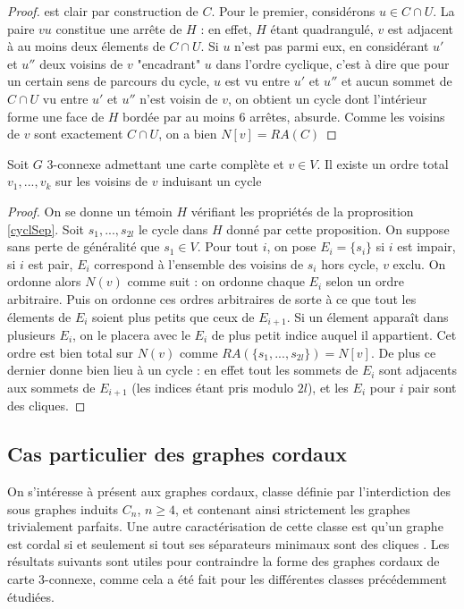 \documentclass{scrartcl}
\begin{document}
\begin{flushleft}
\begin{proof}
    est clair par construction de $C$. Pour le premier, considérons $u \in C \cap U$. La paire $vu$ constitue une arrête de $H$ :
    en effet, $H$ étant quadrangulé, $v$ est adjacent à au moins deux élements de $C \cap U$. Si $u$ n'est pas parmi eux,
    en considérant $u'$ et $u''$ deux voisins de $v$ "encadrant" $u$ dans l'ordre cyclique, c'est à dire que pour un certain
    sens de parcours du cycle, $u$ est vu entre $u'$ et $u''$ et aucun sommet de $C \cap U$ vu entre $u'$ et $u''$ n'est voisin
    de $v$, on obtient un cycle dont l'intérieur forme une face de $H$ bordée par au moins $6$ arrêtes, absurde. Comme les voisins
    de $v$ sont exactement $C \cap U$, on a bien $N[v] = RA(C)$
\end{proof}

\begin{cor}\label{ordCycl}
    Soit $G$ $3$-connexe admettant une carte complète et $v \in V$. Il existe un ordre total $v_1, ..., v_k$ sur les voisins de $v$
    induisant un cycle
\end{cor}

\begin{proof}
    On se donne un témoin $H$ vérifiant les propriétés de la proprosition \ref{cyclSep}. Soit $s_1, ..., s_{2l}$ le cycle dans $H$
    donné par cette proposition. On suppose sans perte de généralité que $s_1 \in V$. Pour tout $i$, on pose $E_i = \{s_i\}$
    si $i$ est impair, si $i$ est pair, $E_i$ correspond à l'ensemble des voisins de $s_i$ hors cycle, $v$ exclu. On ordonne alors $N(v)$
    comme suit : on ordonne chaque $E_i$ selon un ordre arbitraire. Puis on ordonne ces ordres arbitraires de sorte à ce que
    tout les élements de $E_i$ soient plus petits que ceux de $E_{i+1}$. Si un élement apparaît dans plusieurs $E_i$, on le placera avec
    le $E_i$ de plus petit indice auquel il appartient. Cet ordre est bien total sur $N(v)$
    comme $RA(\{s_1, ..., s_{2l}\}) = N[v]$. De plus ce dernier donne bien lieu à un cycle : en effet tout les sommets de $E_i$ sont
    adjacents aux sommets de $E_{i+1}$ (les indices étant pris modulo $2l$), et les $E_i$ pour $i$ pair sont des cliques.
\end{proof}

\subsection{Cas particulier des graphes cordaux}

On s'intéresse à présent aux graphes cordaux, classe définie par l'interdiction des sous graphes induits $C_n$, $n \geq 4$, et contenant
ainsi strictement les graphes trivialement parfaits. Une autre caractérisation de cette classe est qu'un graphe est cordal si et seulement si
tout ses séparateurs minimaux sont des cliques \cite{cordSep}. Les résultats suivants sont utiles pour contraindre la forme des graphes cordaux
de carte $3$-connexe, comme cela a été fait pour les différentes classes précédemment étudiées.


\end{flushleft}
\end{document}
